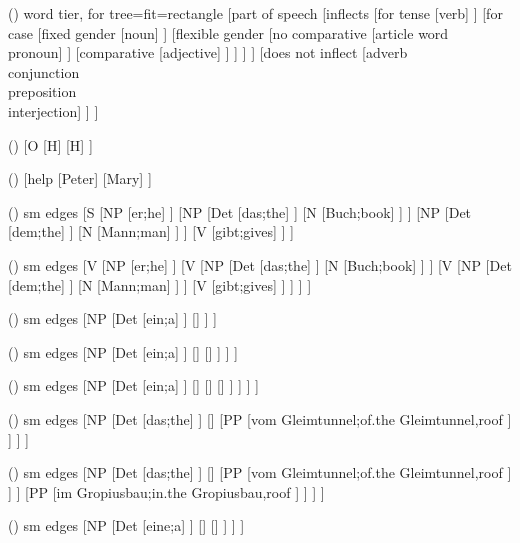 \begin {forest}()
 word tier, for tree={fit=rectangle} [part of speech [inflects [for tense [verb] ] [for case [fixed gender [noun] ] [flexible gender [no comparative [article word\\pronoun] ] [comparative [adjective] ] ] ] ] [does not inflect [adverb\\conjunction\\preposition\\interjection] ] ] \end {forest}
\begin {forest}()
 [O [H] [H] ] \end {forest}
\begin {forest}()
 [help [Peter] [Mary] ] \end {forest}
\begin {forest}()
 sm edges [S [NP [er;he] ] [NP [Det [das;the] ] [N [Buch;book] ] ] [NP [Det [dem;the] ] [N [Mann;man] ] ] [V [gibt;gives] ] ] \end {forest}
\begin {forest}()
 sm edges [V [NP [er;he] ] [V [NP [Det [das;the] ] [N [Buch;book] ] ] [V [NP [Det [dem;the] ] [N [Mann;man] ] ] [V [gibt;gives] ] ] ] ] \end {forest}
\begin {forest}()
 sm edges [NP [Det [ein;a] ] [\nbar [N [Eichhörnchen;squirrel] ] ] ] \end {forest}
\begin {forest}()
 sm edges [NP [Det [ein;a] ] [\nbar [A [graues;grey] ] [\nbar [N [Eichhörnchen;squirrel] ] ] ] ] \end {forest}
\begin {forest}()
 sm edges [NP [Det [ein;a] ] [\nbar [A [großes;big] ] [\nbar [A [graues;grey] ] [\nbar [N [Eichhörnchen;squirrel] ] ] ] ] ] \end {forest}
\begin {forest}()
 sm edges [NP [Det [das;the] ] [\nbar [N [Bild;picture] ] [PP [vom Gleimtunnel;of.the Gleimtunnel,roof ] ] ] ] \end {forest}
\begin {forest}()
 sm edges [NP [Det [das;the] ] [\nbar [\nbar [N [Bild;picture] ] [PP [vom Gleimtunnel;of.the Gleimtunnel,roof ] ] ] [PP [im Gropiusbau;in.the Gropiusbau,roof ] ] ] ] \end {forest}
\begin {forest}()
 sm edges [NP [Det [eine;a] ] [\nbar [A [kluge;smart] ] [\nbar [N [\trace ] ] ] ] ] \end {forest}
